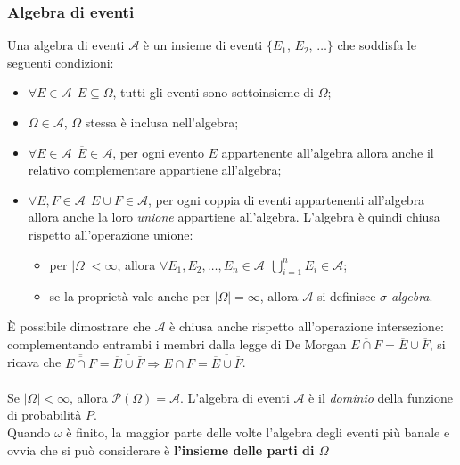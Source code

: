 \subsubsection{Algebra di eventi} 
Una algebra di eventi $\mathcal{A}$ è un insieme di eventi $\{E_1, \, E_2, \, \dots\}$ che soddisfa le seguenti condizioni: \begin{itemize}
    \item $\boxed{\forall E \in \mathcal{A} \ \  E \subseteq \Omega}$, tutti gli eventi sono sottoinsieme di $\Omega$;
    \item $\boxed{\Omega \in \mathcal{A}}$, $\Omega$ stessa è inclusa nell'algebra; 
    \item $\boxed{\forall E \in \mathcal{A} \ \  \overline E \in \mathcal{A}}$, per ogni evento $E$ appartenente all'algebra allora anche il relativo complementare appartiene all'algebra;
    \item $\boxed{\forall E, F \in \mathcal{A} \ \ E \cup F \in \mathcal{A}}$, per ogni coppia di eventi appartenenti all'algebra allora anche la loro \textit{unione} appartiene all'algebra. L'algebra è quindi chiusa rispetto all'operazione unione: \begin{itemize}
        \item per $|\Omega| < \infty$, allora $\forall E_1, E_2, \dots, E_n \in \mathcal{A} \ \ \bigcup_{i=1}^n E_i \in \mathcal{A}$;
        \item se la proprietà vale anche per $|\Omega| = \infty$, allora $\mathcal{A}$ si definisce \textit{$\sigma$-algebra}.
    \end{itemize}
\end{itemize}

\noindent È possibile dimostrare che $\mathcal{A}$ è chiusa anche rispetto all'operazione intersezione: complementando entrambi i membri dalla legge di De Morgan $\overline{E \cap F} = \overline E \cup \overline F$, si ricava che $\overline{\overline{E \cap F}} = \overline{\overline{E} \cup \overline{F}} \Rightarrow E \cap F = \overline{\overline E \cup \overline F}$. \\ \\
\noindent Se $|\Omega| < \infty$, allora $\mathcal{P}(\Omega) = \mathcal{A}$. L'algebra di eventi $\mathcal A$ è il \textit{dominio} della funzione di probabilità $P$. \\

\noindent Quando $\omega$ è finito, la maggior parte delle volte l'algebra degli eventi più banale e ovvia che si può considerare è \textbf{l'insieme delle parti di $\Omega$}

